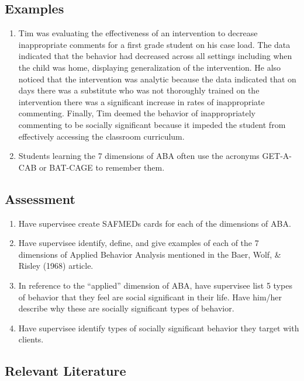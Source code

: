 \subsection{Examples}
\begin{enumerate}
\item Tim was evaluating the effectiveness of an intervention to decrease inappropriate comments for a first grade student on his case load. The data indicated that the behavior had decreased across all settings including when the child was home, displaying generalization of the intervention. He also noticed that the intervention was analytic because the data indicated that on days there was a substitute who was not thoroughly trained on the intervention there was a significant increase in rates of inappropriate commenting. Finally, Tim deemed the behavior of inappropriately commenting to be socially significant because it impeded the student from effectively accessing the classroom curriculum. 
\item Students learning the 7 dimensions of ABA often use the acronyms GET-A-CAB or BAT-CAGE to remember them.
\end{enumerate}
%
\subsection{Assessment}
\begin{enumerate}
\item Have supervisee create SAFMEDs cards for each of the dimensions of ABA.
\item Have supervisee identify, define, and give examples of each of the 7 dimensions of Applied Behavior Analysis mentioned in the Baer, Wolf, \& Risley (1968) article. 
\item In reference to the ``applied'' dimension of ABA, have supervisee list 5 types of behavior that they feel are social significant in their life. Have him/her describe why these are socially significant types of behavior. 
\item Have supervisee identify types of socially significant behavior they target with clients.
\end{enumerate}
%
\subsection{Relevant Literature}
\begin{refsection}
\nocite{cooper2007applied,
    baer1968some,
    baer1987some,
    stokes1977implicit,
    wolf1978social}
\printbibliography[heading=none]
\end{refsection}
%
